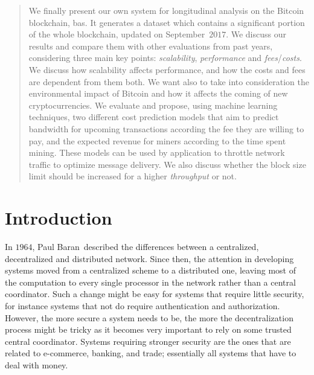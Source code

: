 \documentclass[USenglish]{uit-thesis}
\begin{document}
\begin{abstract}
We finally present our own system for
longitudinal analysis on the Bitcoin blockchain,
\gls{bas}. It generates a dataset
which contains a significant portion of
the whole blockchain, updated on September~$2017$.
We discuss our results and compare them with
other evaluations from past years, considering
three main key points: \emph{scalability},
\emph{performance} and \emph{fees}/\emph{costs}.
We discuss how scalability affects performance,
and how the costs and fees are dependent
from them both.
We want also to take into consideration
the environmental impact of Bitcoin
and how it affects the coming
of new cryptocurrencies.
We evaluate and
propose, using machine learning techniques,
two different cost prediction models that aim to
predict bandwidth for upcoming transactions
according the fee they are willing to pay, and
the expected revenue for miners according to
the time spent mining.
These models can
be used by application to throttle network traffic to optimize
message delivery. We also discuss
whether the block size limit should be increased for a higher
\emph{throughput} or not.
\end{abstract}

\tableofcontents

\listofdefinition

\mainmatter
\chapter{Introduction}
\label{chap:introduction}



In $1964$, Paul Baran\,\cite{Baran1964:ODC}
described the differences
between a centralized, decentralized and distributed
network. Since then, the attention
in developing systems moved from a centralized scheme to a distributed one,
leaving most of the computation to every single processor in the network
rather than a central coordinator.
Such a change might be easy for systems that require little
security, for instance systems that not do require authentication
and authorization.
However, the more secure a system needs to be, the more the decentralization
process might be tricky as it becomes very important to rely on
some trusted central coordinator.
Systems requiring stronger security are the ones that
are related to e-commerce, banking, and trade;
essentially all systems that have to deal with money.
\end{document}
